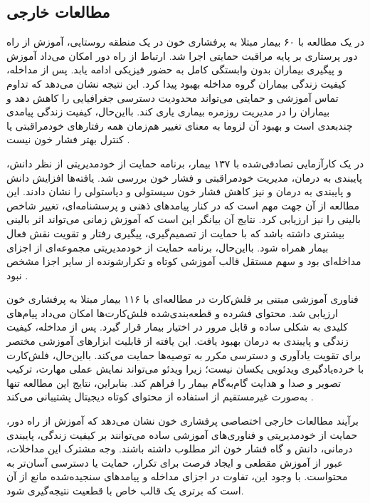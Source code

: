 \subsection{مطالعات خارجی}
در یک مطالعه با ۶۰ بیمار مبتلا به پرفشاری خون در یک منطقه روستایی، آموزش از راه دور پرستاری بر پایه مراقبت حمایتی اجرا شد. ارتباط از راه دور امکان می‌داد آموزش و پیگیری بیماران بدون وابستگی کامل به حضور فیزیکی ادامه یابد. پس از مداخله، کیفیت زندگی بیماران گروه مداخله بهبود پیدا کرد. این نتیجه نشان می‌دهد که تداوم تماس آموزشی و حمایتی می‌تواند محدودیت دسترسی جغرافیایی را کاهش دهد و بیماران را در مدیریت روزمره بیماری یاری کند. بااین‌حال، کیفیت زندگی پیامدی چندبعدی است و بهبود آن لزوما به معنای تغییر هم‌زمان همه رفتارهای خودمراقبتی یا کنترل بهتر فشار خون نیست \cite{suprayitno2023telenursing}.
\par
در یک کارآزمایی تصادفی‌شده با ۱۳۷ بیمار، برنامه حمایت از خودمدیریتی از نظر دانش، پایبندی به درمان، مدیریت خودمراقبتی و فشار خون بررسی شد. یافته‌ها افزایش دانش و پایبندی به درمان و نیز کاهش فشار خون سیستولی و دیاستولی را نشان دادند. این مطالعه از آن جهت مهم است که در کنار پیامدهای ذهنی و پرسشنامه‌ای، تغییر شاخص بالینی را نیز ارزیابی کرد. نتایج آن بیانگر این است که آموزش زمانی می‌تواند اثر بالینی بیشتری داشته باشد که با حمایت از تصمیم‌گیری، پیگیری رفتار و تقویت نقش فعال بیمار همراه شود. بااین‌حال، برنامه حمایت از خودمدیریتی مجموعه‌ای از اجزای مداخله‌ای بود و سهم مستقل قالب آموزشی کوتاه و تکرارشونده از سایر اجزا مشخص نبود \cite{kurt2022selfmgmt}.
\par
فناوری آموزشی مبتنی بر فلش‌کارت در مطالعه‌ای با ۱۱۶ بیمار مبتلا به پرفشاری خون ارزیابی شد. محتوای فشرده و قطعه‌بندی‌شده فلش‌کارت‌ها امکان می‌داد پیام‌های کلیدی به شکلی ساده و قابل مرور در اختیار بیمار قرار گیرد. پس از مداخله، کیفیت زندگی و پایبندی به درمان بهبود یافت. این یافته از قابلیت ابزارهای آموزشی مختصر برای تقویت یادآوری و دسترسی مکرر به توصیه‌ها حمایت می‌کند. بااین‌حال، فلش‌کارت با خرده‌یادگیری ویدئویی یکسان نیست؛ زیرا ویدئو می‌تواند نمایش عملی مهارت، ترکیب تصویر و صدا و هدایت گام‌به‌گام بیمار را فراهم کند. بنابراین، نتایج این مطالعه تنها به‌صورت غیرمستقیم از استفاده از محتوای کوتاه دیجیتال پشتیبانی می‌کند \cite{desouza2016flashcard}.
\par
برآیند مطالعات خارجی اختصاصی پرفشاری خون نشان می‌دهد که آموزش از راه دور، حمایت از خودمدیریتی و فناوری‌های آموزشی ساده می‌توانند بر کیفیت زندگی، پایبندی درمانی، دانش و گاه فشار خون اثر مطلوب داشته باشند. وجه مشترک این مداخلات، عبور از آموزش مقطعی و ایجاد فرصت برای تکرار، حمایت یا دسترسی آسان‌تر به محتواست. با وجود این، تفاوت در اجزای مداخله و پیامدهای سنجیده‌شده مانع از آن است که برتری یک قالب خاص با قطعیت نتیجه‌گیری شود.


